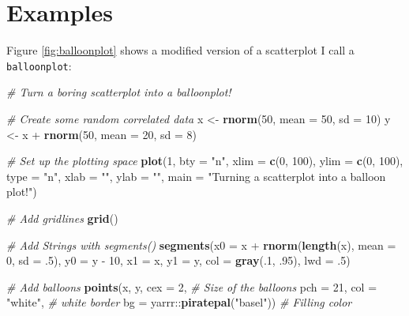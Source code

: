 \documentclass[]{book}
\newenvironment{Shaded}{\begin{snugshade}}{\end{snugshade}}
\newcommand{\KeywordTok}[1]{\textcolor[rgb]{0.13,0.29,0.53}{\textbf{{#1}}}}
\newcommand{\DataTypeTok}[1]{\textcolor[rgb]{0.13,0.29,0.53}{{#1}}}
\newcommand{\DecValTok}[1]{\textcolor[rgb]{0.00,0.00,0.81}{{#1}}}
\newcommand{\StringTok}[1]{\textcolor[rgb]{0.31,0.60,0.02}{{#1}}}
\newcommand{\CommentTok}[1]{\textcolor[rgb]{0.56,0.35,0.01}{\textit{{#1}}}}
\newcommand{\NormalTok}[1]{{#1}}
\theoremstyle{definition}
\theoremstyle{definition}
\theoremstyle{remark}
\begin{document}
\section{Examples}\label{examples}

Figure \ref{fig:balloonplot} shows a modified version of a scatterplot I
call a \texttt{balloonplot}:

\begin{Shaded}
\begin{Highlighting}[]
\CommentTok{# Turn a boring scatterplot into a  balloonplot! }

\CommentTok{# Create some random correlated data}
\NormalTok{x <-}\StringTok{ }\KeywordTok{rnorm}\NormalTok{(}\DecValTok{50}\NormalTok{, }\DataTypeTok{mean =} \DecValTok{50}\NormalTok{, }\DataTypeTok{sd =} \DecValTok{10}\NormalTok{)}
\NormalTok{y <-}\StringTok{ }\NormalTok{x +}\StringTok{ }\KeywordTok{rnorm}\NormalTok{(}\DecValTok{50}\NormalTok{, }\DataTypeTok{mean =} \DecValTok{20}\NormalTok{, }\DataTypeTok{sd =} \DecValTok{8}\NormalTok{)}

\CommentTok{# Set up the plotting space}
\KeywordTok{plot}\NormalTok{(}\DecValTok{1}\NormalTok{, }
     \DataTypeTok{bty =} \StringTok{"n"}\NormalTok{,}
     \DataTypeTok{xlim =} \KeywordTok{c}\NormalTok{(}\DecValTok{0}\NormalTok{, }\DecValTok{100}\NormalTok{),}
     \DataTypeTok{ylim =} \KeywordTok{c}\NormalTok{(}\DecValTok{0}\NormalTok{, }\DecValTok{100}\NormalTok{),}
     \DataTypeTok{type =} \StringTok{"n"}\NormalTok{, }\DataTypeTok{xlab =} \StringTok{""}\NormalTok{, }\DataTypeTok{ylab =} \StringTok{""}\NormalTok{, }
     \DataTypeTok{main =} \StringTok{"Turning a scatterplot into a balloon plot!"}\NormalTok{)}

\CommentTok{# Add gridlines}
\KeywordTok{grid}\NormalTok{()}

\CommentTok{# Add Strings with segments()}
\KeywordTok{segments}\NormalTok{(}\DataTypeTok{x0 =} \NormalTok{x +}\StringTok{ }\KeywordTok{rnorm}\NormalTok{(}\KeywordTok{length}\NormalTok{(x), }\DataTypeTok{mean =} \DecValTok{0}\NormalTok{, }\DataTypeTok{sd =} \NormalTok{.}\DecValTok{5}\NormalTok{), }
         \DataTypeTok{y0 =} \NormalTok{y -}\StringTok{ }\DecValTok{10}\NormalTok{, }
         \DataTypeTok{x1 =} \NormalTok{x, }
         \DataTypeTok{y1 =} \NormalTok{y, }
         \DataTypeTok{col =} \KeywordTok{gray}\NormalTok{(.}\DecValTok{1}\NormalTok{, .}\DecValTok{95}\NormalTok{),}
         \DataTypeTok{lwd =} \NormalTok{.}\DecValTok{5}\NormalTok{)}

\CommentTok{# Add balloons}
\KeywordTok{points}\NormalTok{(x, y, }
       \DataTypeTok{cex =} \DecValTok{2}\NormalTok{, }\CommentTok{# Size of the balloons}
       \DataTypeTok{pch =} \DecValTok{21}\NormalTok{, }
       \DataTypeTok{col =} \StringTok{"white"}\NormalTok{, }\CommentTok{# white border}
       \DataTypeTok{bg =} \NormalTok{yarrr::}\KeywordTok{piratepal}\NormalTok{(}\StringTok{"basel"}\NormalTok{))  }\CommentTok{# Filling color}
\end{Highlighting}
\end{Shaded}
\end{document}
